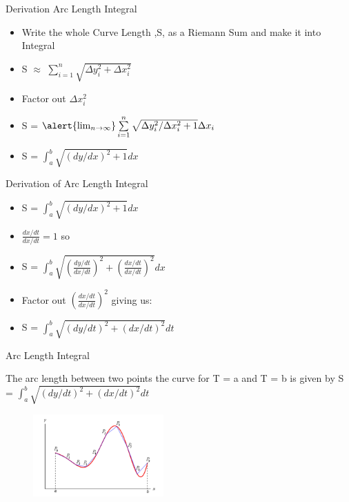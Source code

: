 \documentclass{beamer}
\begin{document}
\begin{frame}{Derivation Arc Length Integral}
	
	\begin{itemize}
		\item Write the whole Curve Length ,S, as a Riemann Sum and make it into Integral
		\item S $\approx$ $\sum\limits^{n}_{i=1}{\sqrt{\Delta y_i^2 + \Delta x_i^2}}$
		\item Factor out $\Delta x_i^2$
		\item S = ${\alert{\lim_{n \to \infty}}}\sum\limits^{n}_{i=1}{\sqrt{\Delta y_i^2/\Delta x_i^2 + 1}} \Delta x_i$
		\item S = $\int_{a}^{b} \sqrt{(dy/dx)^2+1}dx$
	\end{itemize}
\end{frame}

\begin{frame}{Derivation of Arc Length Integral}
	
	\begin{itemize}
		\item S = $\int_{a}^{b} \sqrt{(dy/dx)^2+1}dx$ 
		\item $\frac{dx/dt}{dx/dt}=1$ so
		\item S = $\int_{a}^{b} \sqrt{(\frac{dy/dt}{dx/dt})^2+(\frac{dx/dt}{dx/dt})^2}dx$
		\item Factor out $(\frac{dx/dt}{dx/dt})^2$ giving us:
		\item S = $\int_{a}^{b} \sqrt{(dy/dt)^2+(dx/dt)^2}dt$
	\end{itemize}
\end{frame}

\begin{frame}{Arc Length Integral}
	\begin{theorem}
		The arc length between two points the curve for T = a and T = b is given by
		S = $\int_{a}^{b} \sqrt{(dy/dt)^2+(dx/dt)^2}dt$
	\end{theorem}
	\begin{figure}
		\centering
		\includegraphics[width=50mm, scale=0.4]{Arc length Integral.png}
	\end{figure}
\end{frame}
\end{document}
